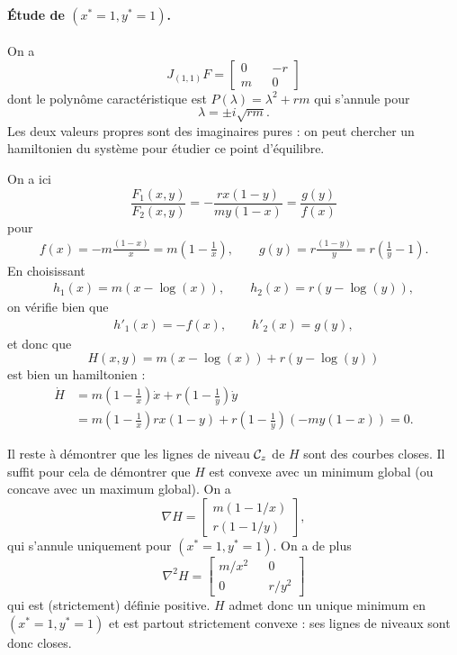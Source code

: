 \paragraph*{\'Etude de $(x^* = 1, y^* = 1)$.}
On a 
$$
J_{(1, 1)}F = 
  \left[\begin{array}{ccc} 
    0 & & -r  \\
    m  & & 0
  \end{array}\right]
$$
dont le polynôme caractéristique est $P(\lambda) = \lambda^2 + rm$ qui s'annule pour
$$
\lambda = \pm i \sqrt{rm}.
$$
Les deux valeurs propres sont des imaginaires pures : on peut chercher un hamiltonien du système pour étudier ce point d'équilibre.

\bigskip
On a ici
$$
\frac{F_1(x, y)}{F_2(x, y)} = -\frac{rx(1-y)}{my(1-x)} = \frac{g(y)}{f(x)}
$$
pour
\begin{align*}
f(x) = -m \frac{(1-x)}{x} = m \left(1 - \frac1x\right), \qquad
g(y) = r \frac{(1-y)}{y} = r \left(\frac1y - 1\right).
\end{align*}
En choisissant 
\begin{align*}
  h_1(x) = m(x-\log(x)), \qquad h_2(x) = r(y-\log(y)),
\end{align*}
on vérifie bien que
\begin{align*}
  h'_1(x) = -f(x), \qquad h'_2(x) = g(y),
\end{align*}
et donc que 
$$
H(x, y) = m(x-\log(x)) + r(y-\log(y))
$$
est bien un hamiltonien : 
\begin{align*}
\dot H 
& = m\left(1 - \frac1x\right) \dot x + r \left(1 - \frac1y\right) \dot y \\
& = m\left(1 - \frac1x\right) r x (1 - y) + r \left(1 - \frac1y\right) (- m y (1 - x)) 
= 0.
\end{align*}

\bigskip
Il reste à démontrer que les lignes de niveau $\mathcal{C}_z$ de $H$ sont des courbes closes. Il suffit pour cela de démontrer que $H$ est convexe avec un minimum global (ou concave avec un maximum global). On a
$$
\nabla H = \left[\begin{array}{c} m(1 - 1/x) \\ r(1 - 1/y)\end{array}\right], 
$$
qui s'annule uniquement pour $(x^* = 1, y^*=1)$. On a de plus
$$
\nabla^2 H = \left[\begin{array}{ccc} m/x^2 & & 0 \\ 0 & & r/y^2 \end{array}\right] 
$$
qui est (strictement) définie positive.
$H$ admet donc un unique minimum en $(x^* = 1, y^*=1)$ et est partout strictement convexe : ses lignes de niveaux sont donc closes.

